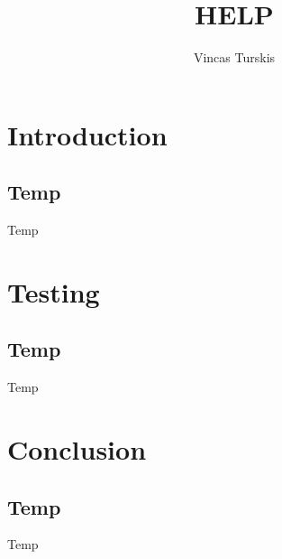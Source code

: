 \psset{xunit=1cm,yunit=1cm}\documentclass[11pt,a4paper]{report}
\author{Vincas Turskis}
\title{HELP}
\begin{document}
\tableofcontents
\chapter{Introduction}
\section{Temp}
Temp







\chapter{Testing}
\section{Temp}
Temp

\chapter{Conclusion}
\section{Temp}
Temp

\printbibliography
\end{document}
